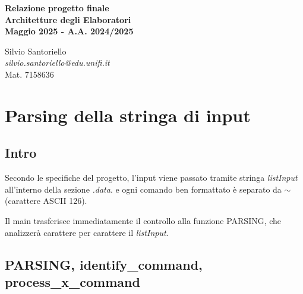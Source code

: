 \documentclass[11pt]{report}
\date{}
\author{Silvio Santoriello}
\begin{document}
    
     \thispagestyle{empty}
    
    \vspace*{4cm} %
    
    \begin{center}
        {\Huge \bfseries Relazione progetto finale\\
        Architetture degli Elaboratori\\
         Maggio 2025 - A.A. 2024/2025\\}
    \end{center}
    
    \vspace{3cm} %
    
    \begin{center}
        
    \end{center}
    
    \vspace{3cm} %
    
    \begin{center}
        {\large
        Silvio Santoriello\\[0.3cm]
        \textit{silvio.santoriello@edu.unifi.it}\\[0.3cm]
        Mat. 7158636
        }
    \end{center}
    
    \newpage
    \tableofcontents
    

    \chapter{Parsing della stringa di input}
    \justifying
    \section{Intro}
    
    Secondo le specifiche del progetto, l'input viene passato tramite stringa \textit{listInput} all'interno della sezione \textit{.data}. e ogni comando ben formattato è separato da $\sim$ (carattere ASCII 126).

    Il main trasferisce immediatamente il controllo alla funzione PARSING, che analizzerà carattere per carattere il \textit{listInput}.

    \section{PARSING, identify\_command, process\_\textbf{x}\_command}
\end{document}
